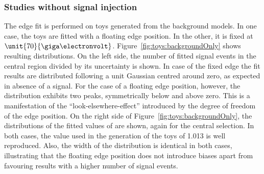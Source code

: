 \subsubsection{Studies without signal injection}
\label{sec:toysWO}
The edge fit is performed on toys generated from the background models. In one case, the toys are fitted with a floating edge position. In the other, it is fixed at $\unit{70}{\giga\electronvolt}$. Figure~\ref{fig:toys:backgroundOnly} shows resulting distributions. On the left side, the number of fitted signal events in the central region divided by its uncertainty is shown. In case of the fixed edge the fit results are distributed following a unit Gaussian centred around zero, as expected in absence of a signal.  For the case of a floating edge position, however, the distribution exhibits two peaks, symmetrically below and above zero. This is a manifestation of the ``look-elsewhere-effect'' introduced by the degree of freedom of the edge position. On the right side of Figure~\ref{fig:toys:backgroundOnly}, the distributions of the fitted values of \Rsfof are shown, again for the central selection. In both cases, the value used in the generation of the toys of 1.013 is well reproduced. Also, the width of the distribution is identical in both cases,  illustrating that the floating edge position does not introduce biases apart from favouring results with a higher number of signal events.
